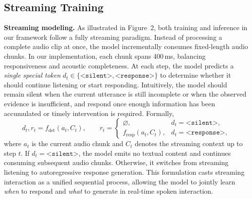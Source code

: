 \documentclass{article}
\begin{document}
\subsection{Streaming Training}
\vspace{-1mm}
\textbf{Streaming modeling.}  As illustrated in Figure~2, both training and inference in our framework follow a fully streaming paradigm. Instead of processing a complete audio clip at once, the model incrementally consumes fixed-length audio chunks. In our implementation, each chunk spans 400\,ms, balancing responsiveness and acoustic completeness. At each step, the model predicts a \emph{single special token} $d_t \in \{\texttt{<silent>}, \texttt{<response>}\}$ to determine whether it should continue listening or start responding. Intuitively, the model should remain silent when the current utterance is still incomplete or when the observed evidence is insufficient, and respond once enough information has been accumulated or timely intervention is required. Formally,
\[
d_t, r_t = f_{\mathrm{det}}(a_t, C_t), \qquad
r_t =
\begin{cases}
\varnothing, & d_t=\texttt{<silent>},\\[4pt]
f_{\mathrm{resp}}(a_t, C_t), & d_t=\texttt{<response>},
\end{cases}
\]
where $a_t$ is the current audio chunk and $C_t$ denotes the streaming context up to step $t$. If $d_t=\texttt{<silent>}$, the model emits no textual content and continues consuming subsequent audio chunks. Otherwise, it switches from streaming listening to autoregressive response generation. This formulation casts streaming interaction as a unified sequential process, allowing the model to jointly learn \emph{when} to respond and \emph{what} to generate in real-time spoken interaction.
\end{document}
